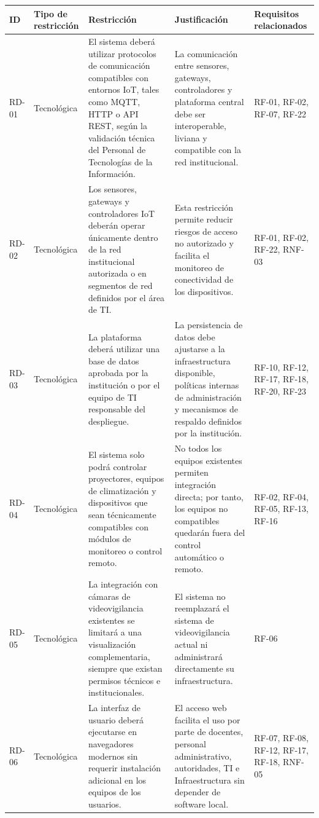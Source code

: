 \begingroup
\small
\begin{longtable}{|P{0.2000}|P{0.2000}|P{0.2000}|P{0.2000}|P{0.2000}|}
\hline
ID & Tipo de restricción & Restricción & Justificación & Requisitos relacionados \\ \hline
RD-01 & Tecnológica & El sistema deberá utilizar protocolos de comunicación compatibles con entornos IoT, tales como MQTT, HTTP o API REST, según la validación técnica del Personal de Tecnologías de la Información. & La comunicación entre sensores, gateways, controladores y plataforma central debe ser interoperable, liviana y compatible con la red institucional. & RF-01, RF-02, RF-07, RF-22 \\ \hline
RD-02 & Tecnológica & Los sensores, gateways y controladores IoT deberán operar únicamente dentro de la red institucional autorizada o en segmentos de red definidos por el área de TI. & Esta restricción permite reducir riesgos de acceso no autorizado y facilita el monitoreo de conectividad de los dispositivos. & RF-01, RF-02, RF-22, RNF-03 \\ \hline
RD-03 & Tecnológica & La plataforma deberá utilizar una base de datos aprobada por la institución o por el equipo de TI responsable del despliegue. & La persistencia de datos debe ajustarse a la infraestructura disponible, políticas internas de administración y mecanismos de respaldo definidos por la institución. & RF-10, RF-12, RF-17, RF-18, RF-20, RF-23 \\ \hline
RD-04 & Tecnológica & El sistema solo podrá controlar proyectores, equipos de climatización y dispositivos que sean técnicamente compatibles con módulos de monitoreo o control remoto. & No todos los equipos existentes permiten integración directa; por tanto, los equipos no compatibles quedarán fuera del control automático o remoto. & RF-02, RF-04, RF-05, RF-13, RF-16 \\ \hline
RD-05 & Tecnológica & La integración con cámaras de videovigilancia existentes se limitará a una visualización complementaria, siempre que existan permisos técnicos e institucionales. & El sistema no reemplazará el sistema de videovigilancia actual ni administrará directamente su infraestructura. & RF-06 \\ \hline
RD-06 & Tecnológica & La interfaz de usuario deberá ejecutarse en navegadores modernos sin requerir instalación adicional en los equipos de los usuarios. & El acceso web facilita el uso por parte de docentes, personal administrativo, autoridades, TI e Infraestructura sin depender de software local. & RF-07, RF-08, RF-12, RF-17, RF-18, RNF-05 \\ \hline

\end{longtable}
